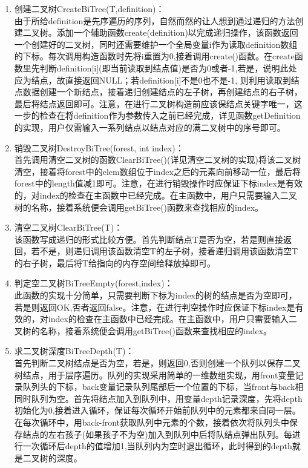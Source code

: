 \documentclass[supercite]{Experimental_Report}
\theoremstyle{definition}
\begin{document}
\begin{enumerate}
	\item 创建二叉树CreateBiTree(T,definition)：\\由于所给definition是先序遍历的序列，自然而然的让人想到通过递归的方法创建二叉树。添加一个辅助函数create(definition)以完成递归操作，该函数返回一个创建好的二叉树，同时还需要维护一个全局变量i作为读取definition数组的下标。每次调用构造函数时先将i重置为0,接着调用create()函数。在create函数里先判断definition[i](即当前读取到结点值)是否为0或者-1,若是，说明此处应为结点，故直接返回NULL；若definition[i]不是0也不是-1, 则利用读取到结点数据创建一个新结点，接着递归创建结点的左子树，再创建结点的右子树，最后将结点返回即可。注意，在进行二叉树构造前应该保结点关键字唯一，这一步的检查在将definition作为参数传入之前已经完成，详见函数getDefinition的实现，用户仅需输入一系列结点以结点对应的满二叉树中的序号即可。
 	\item 销毁二叉树DestroyBiTree(forest, int index)：\\首先调用清空二叉树的函数ClearBiTree()(详见清空二叉树的实现)将该二叉树清空，接着将forest中的elem数组位于index之后的元素向前移动一位，最后将forest中的length值减1即可。注意，在进行销毁操作时应保证下标index是有效的，对index的检查在主函数中已经完成。在主函数中，用户只需要输入二叉树的名称，接着系统便会调用getBiTree()函数来查找相应的index。
  	\item 清空二叉树ClearBiTree(T)：\\该函数写成递归的形式比较方便。首先判断结点T是否为空，若是则直接返回，若不是，则递归调用该函数清空T的左子树，接着递归调用该函数清空T的右子树，最后将T给指向的内存空间给释放掉即可。
   	\item 判定空二叉树BiTreeEmpty(forest,index)：\\此函数的实现十分简单，只需要判断下标为index的树的结点是否为空即可， 若是则返回OK,否者返回false。注意，在进行判空操作时应保证下标index是有效的，对index的检查在主函数中已经完成。在主函数中，用户只需要输入二叉树的名称，接着系统便会调用getBiTree()函数来查找相应的index。
    \item 求二叉树深度BiTreeDepth(T)：\\首先判断二叉树结点是否为空，若是，则返回0,否则创建一个队列以保存二叉树结点，用于层序遍历。队列的实现采用简单的一维数组实现，用front变量记录队列头的下标，back变量记录队列尾部后一个位置的下标，当front与back相同时队列为空。首先将结点加入到队列中，用变量depth记录深度，先将depth初始化为0,接着进入循环，保证每次循环开始前队列中的元素都来自同一层。在每次循环中，用back-front获取队列中元素的个数，接着依次将队列头中保存结点的左右孩子(如果孩子不为空)加入到队列中后将队结点弹出队列。每进行一次循环后depth的值增加1,当队列内为空时退出循环，此时得到的depth就是二叉树的深度。

\end{enumerate}
\end{document}
